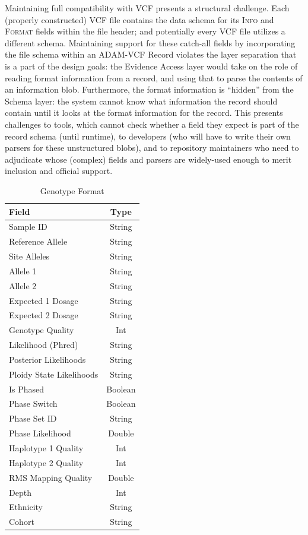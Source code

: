 \documentclass[10pt,twocolumn]{article}
\theoremstyle{plain}
\begin{document}
Maintaining full compatibility with VCF presents a structural challenge. Each (properly constructed) VCF file contains the data schema for
its \textsc{Info} and \textsc{Format} fields within the file header; and potentially every VCF file utilizes a different schema. Maintaining support
for these catch-all fields by incorporating the file schema within an ADAM-VCF Record violates the layer separation that is a part of the design
goals: the Evidence Access layer would take on the role of reading format information from a record, and using that to parse the contents of an
information blob. Furthermore, the format information is ``hidden'' from the Schema layer: the system cannot know what information the record
should contain until it looks at the format information for the record. This presents challenges to tools, which cannot check whether a field they
expect is part of the record schema (until runtime), to developers (who will have to write their own parsers for these unstructured blobs), and to
repository maintainers who need to adjudicate whose (complex) fields and parsers are widely-used enough to merit inclusion and official support.

\begin{table}[h]
\caption{Genotype Format}
\label{tab:genotype-format}
\begin{center}
\begin{tabular}{| l | c |}
\hline
\bf Field & \bf Type \\
\hline
Sample ID & String \\
Reference Allele & String \\
Site Alleles & String \\
Allele 1 & String \\
Allele 2 & String \\
Expected 1 Dosage & String \\
Expected 2 Dosage & String \\
Genotype Quality & Int \\
Likelihood (Phred) & String \\
Posterior Likelihoods & String \\
Ploidy State Likelihoods & String \\
Is Phased & Boolean \\
Phase Switch & Boolean \\
Phase Set ID & String \\
Phase Likelihood & Double \\
Haplotype 1 Quality & Int \\
Haplotype 2 Quality & Int \\
RMS Mapping Quality & Double \\
Depth & Int \\
Ethnicity & String \\
Cohort & String \\
\hline
\end{tabular}
\end{center}
\end{table}
\end{document}

